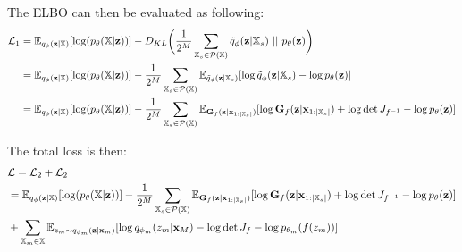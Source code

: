 \documentclass[11pt,english]{article}
\begin{document}
    The ELBO can then be evaluated as following:
    \begin{equation}
        \begin{split}
            \mathcal{L}_1 &=  \mathbb{E}_{q_{\phi}(\textbf{z}|\mathbb{X})}[\log (p_{\theta}(\mathbb{X}|\textbf{z}))] - D_{KL}\biggl( \frac{1}{2^M} \sum _{\mathbb{X}_s \in \mathcal{P}(\mathbb{X})} \tilde{q}_{\phi}(\textbf{z}|\mathbb{X}_s)\ ||\ p_{\theta}(\textbf{z})\biggr)\\
            &= \mathbb{E}_{q_{\phi}(\textbf{z}|\mathbb{X})}[\log (p_{\theta}(\mathbb{X}|\textbf{z}))] - \frac{1}{2^M} \sum _{\mathbb{X}_s \in \mathcal{P}(\mathbb{X})} \mathbb{E}_{\tilde{q}_{\phi}(\textbf{z}|\mathbb{X}_s)}[\log \tilde{q}_{\phi}(\textbf{z}|\mathbb{X}_s) - \log p_{\theta}(\textbf{z}) ]\\
            &= \mathbb{E}_{q_{\phi}(\textbf{z}|\mathbb{X})}[\log (p_{\theta}(\mathbb{X}|\textbf{z}))] - \frac{1}{2^M} \sum _{\mathbb{X}_s \in \mathcal{P}(\mathbb{X})} \mathbb{E}_{\textbf{G}_f(\textbf{z}|\textbf{x}_{1:|\xsubset|})}[\log \textbf{G}_f(\textbf{z}|\textbf{x}_{1:|\xsubset|}) + \log \det J_{f^{-1}}- \log p_{\theta}(\textbf{z}) ]
        \end{split}
    \end{equation}

    The total loss is then:
    \begin{equation}
        \begin{split}
            &\mathcal{L} = \mathcal{L}_2 + \mathcal{L}_2\\
            &= \mathbb{E}_{q_{\phi}(\textbf{z}|\mathbb{X})}[\log (p_{\theta}(\mathbb{X}|\textbf{z}))] - \frac{1}{2^M} \sum _{\mathbb{X}_s \in \mathcal{P}(\mathbb{X})} \mathbb{E}_{\textbf{G}_f(\textbf{z}|\textbf{x}_{1:|\mathbb{X}_s|})}[\log \textbf{G}_f(\textbf{z}|\textbf{x}_{1:|\mathbb{X}_s|}) + \log \det J_{f^{-1}}- \log p_{\theta}(\textbf{z}) ]\\
            &+ \sum _{\mathbb{X}_m \in \mathbb{X}} \mathbb{E}_{z_m \sim q_{\phi_m}(\textbf{z}|\textbf{x}_m)} [\log q_{\phi_m}(z_m|\textbf{x}_M) - \log \det J_f  - \log p_{\theta_m}(f(z_m))]
        \end{split}
    \end{equation}
\end{document}
